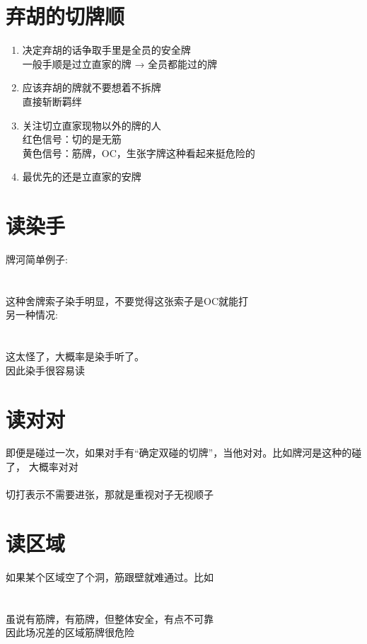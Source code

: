 \documentclass[小V的日麻笔记.tex]{subfiles}
\begin{document}
\section{弃胡的切牌顺}
\begin{enumerate}
\item 决定弃胡的话争取手里是全员的安全牌 \\
一般手顺是过立直家的牌 → 全员都能过的牌
\item 应该弃胡的牌就不要想着不拆牌 \\
直接斩断羁绊
\item 关注切立直家现物以外的牌的人 \\
红色信号：切的是无筋 \\
黄色信号：筋牌，OC，生张字牌这种看起来挺危险的
\item 最优先的还是立直家的安牌
\end{enumerate}

\section{读染手}
牌河简单例子:\\
\\
\\
这种舍牌索子染手明显，不要觉得这张索子是OC就能打
\\
另一种情况:\\
\\
 \\
这太怪了，大概率是染手听了。
\\
因此染手很容易读

\section{读对对}
即便是碰过一次，如果对手有“确定双碰的切牌”，当他对对。比如牌河是这种的碰了， 大概率对对\\ 
\\
切打表示不需要进张，那就是重视对子无视顺子

\section{读区域}
如果某个区域空了个洞，筋跟壁就难通过。比如\\
\\
\\
虽说有筋牌，有筋牌，但整体安全，有点不可靠
\\
因此场况差的区域筋牌很危险
\end{document}
